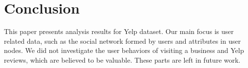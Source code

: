 \documentclass[10pt]{sig-alternate-10pt}   	%
\begin{document}
\section{Conclusion}
This paper presents analysis results for Yelp dataset. Our main focus is user related data, such as the social network 
formed by users and attributes in user nodes.  We did not investigate the user behaviors of visiting a business and Yelp 
reviews, which are believed to be valuable.  These parts are left in future work. 


 
\end{document}
